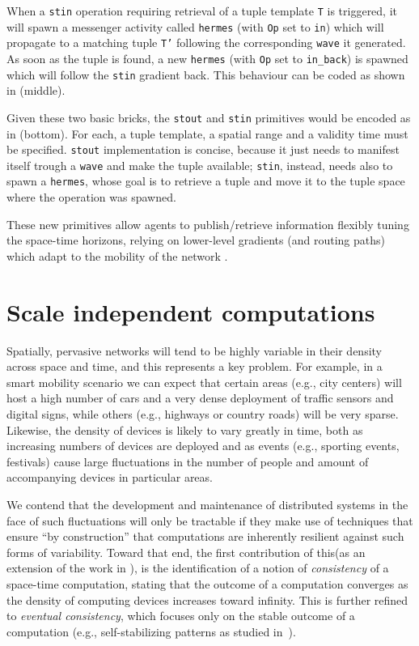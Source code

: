 \documentclass[12pt,a4paper,twoside,openright]{book}
\begin{document}
When a \texttt{stin} operation requiring retrieval of a tuple template \texttt{T} is triggered, it will spawn a messenger activity called \texttt{hermes} (with \texttt{Op} set to \texttt{in}) which will propagate to a matching tuple \texttt{T'} following the corresponding \texttt{wave} it generated. As soon as the tuple is found, a new \texttt{hermes} (with \texttt{Op} set to \texttt{in\_back}) is spawned which will follow the \texttt{stin} gradient back. This behaviour can be coded as shown in  (middle). 

Given these two basic bricks, the \texttt{stout} and \texttt{stin} primitives would be encoded as in  (bottom). For each, a tuple template, a spatial range and a validity time must be specified. \texttt{stout} implementation is concise, because it just needs to manifest itself trough a \texttt{wave} and make the tuple available; \texttt{stin}, instead, needs also to spawn a \texttt{hermes}, whose goal is to retrieve a tuple and move it to the tuple space where the operation was spawned.

These new primitives allow agents to publish/retrieve information flexibly tuning the space-time horizons, relying on lower-level gradients (and routing paths) which adapt to the mobility of the network \cite{flexiblegradients}.

\chapter{Scale independent computations}
\label{scale-independent-computations}

Spatially, pervasive networks will tend to be highly variable in their density across space and time, and this represents a key problem.
%
For example, in a smart mobility scenario we can expect that certain areas (e.g., city centers) will host a high number of cars and a very dense deployment of traffic sensors and digital signs, while others (e.g., highways or country roads) will be very sparse.
%
Likewise, the density of devices is likely to vary greatly in time, both as increasing numbers of devices are deployed and as events (e.g., sporting events, festivals) cause large fluctuations in the number of people and amount of accompanying devices in particular areas.

We contend that the development and maintenance of distributed systems in the face of such fluctuations will only be tractable if they make use of techniques that ensure ``by construction'' that computations are inherently resilient against such forms of variability.
%
Toward that end, the first contribution of this\levelText{}(as an extension of the work in \cite{BVD-SCW14}), is the identification of a notion of \emph{consistency} of a space-time computation, stating that the outcome of a computation converges as the density of computing devices increases toward infinity.
%
This is further refined to \emph{eventual consistency}, which focuses only on the stable outcome of a computation (e.g., self-stabilizing patterns as studied in~\cite{VD-COORD2014-LNCS2014}).
\end{document}
